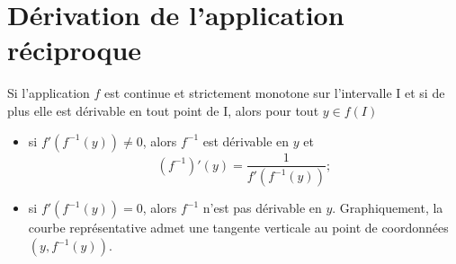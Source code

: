 \section{Dérivation de l'application réciproque}
%
\begin{theo}
  Si l'application \(f\) est continue et strictement monotone sur l'intervalle I et si de plus elle est dérivable en tout point de I, alors pour tout \(y \in f(I)\)
  \begin{itemize}
  \item si \(f'(f^{-1}(y)) \neq 0\), alors \(f^{-1}\) est dérivable en \(y\) et
    \begin{equation}
      \left(f^{-1} \right)'(y)=\frac{1}{f'\left(f^{-1}(y)\right)};
    \end{equation}
  \item si \(f'(f^{-1}(y)) = 0\), alors \(f^{-1}\) n'est pas dérivable en \(y\). Graphiquement, la courbe représentative admet une tangente verticale au point de coordonnées \((y,f^{-1}(y))\).
  \end{itemize}
\end{theo}

